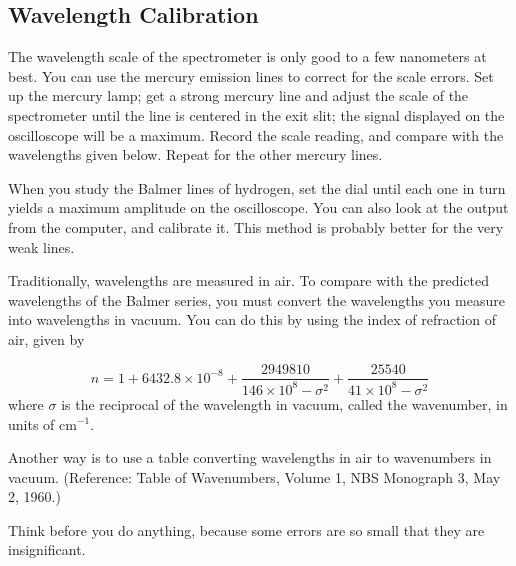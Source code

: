\documentclass{../lab}
\begin{document}
\subsection{Wavelength Calibration}

The wavelength scale of the spectrometer is only good to a few nanometers at best. You can use the mercury emission lines to correct for the scale errors. Set up the mercury lamp; get a strong mercury line and adjust the scale of the spectrometer until the line is centered in the exit slit; the signal displayed on the oscilloscope will be a maximum. Record the scale reading, and compare with the wavelengths given below. Repeat for the other mercury lines.

When you study the Balmer lines of hydrogen, set the dial until each one in turn yields a maximum amplitude on the oscilloscope. You can also look at the output from the computer, and calibrate it. This method is probably better for the very weak lines.

Traditionally, wavelengths are measured in air. To compare with the predicted wavelengths of the Balmer series, you must convert the wavelengths you measure into wavelengths in vacuum. You can do this by using the index of refraction of air, given by

\begin{equation}
    n=1+6432.8 \times 10^{-8}+\frac{2949810}{146\times10^8-\sigma^{2}}+\frac{25540}{41\times10^8-\sigma^{2}}
\end{equation}
where $\sigma$ is the reciprocal of the wavelength in vacuum, called the wavenumber, in units of cm$^{-1}$.

Another way is to use a table converting wavelengths in air to wavenumbers in vacuum. (Reference: Table of Wavenumbers, Volume 1, NBS Monograph 3, May 2, 1960.)

Think before you do anything, because some errors are so small that they are insignificant.
\end{document}
